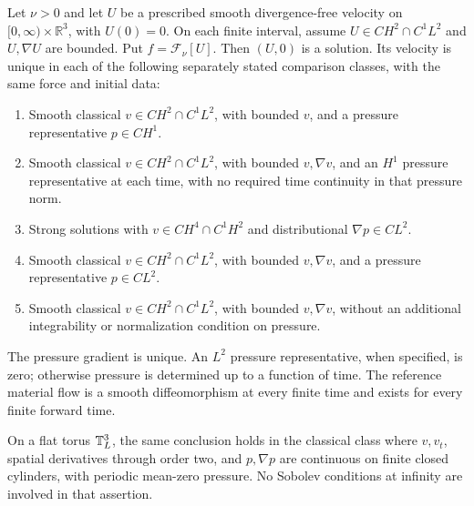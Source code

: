\begin{lemma}
\label{lem:b-comparison}\label{lem:p2-realization}
Let $\nu>0$ and let $U$ be a prescribed smooth divergence-free velocity
on $[0,\infty)\times\mathbb R^3$, with $U(0)=0$. On each finite interval,
assume $U\in CH^2\cap C^1L^2$ and $U,\nabla U$ are bounded. Put
$f=\mathcal F_\nu[U]$. Then $(U,0)$ is a solution. Its velocity is unique
in each of the following separately stated comparison classes, with the
same force and initial data:
\begin{enumerate}[label=(\roman*),itemsep=2pt]
\item Smooth classical $v\in CH^2\cap C^1L^2$, with bounded $v$, and a
pressure representative $p\in CH^1$.
\item Smooth classical $v\in CH^2\cap C^1L^2$, with bounded $v,\nabla v$,
and an $H^1$ pressure representative at each time, with no required time
continuity in that pressure norm.
\item Strong solutions with $v\in CH^4\cap C^1H^2$ and distributional
$\nabla p\in CL^2$.
\item Smooth classical $v\in CH^2\cap C^1L^2$, with bounded $v,\nabla v$,
and a pressure representative $p\in CL^2$.
\item Smooth classical $v\in CH^2\cap C^1L^2$, with bounded $v,\nabla v$,
without an additional integrability or normalization condition on pressure.
\end{enumerate}
The pressure gradient is unique. An $L^2$ pressure representative, when
specified, is zero; otherwise pressure is determined up to a function of
time. The reference material flow is a smooth diffeomorphism at every
finite time and exists for every finite forward time.

On a flat torus $\mathbb T_L^3$, the same conclusion holds in the classical class
where $v,v_t$, spatial derivatives through order two, and $p,\nabla p$ are
continuous on finite closed cylinders, with periodic mean-zero pressure.
No Sobolev conditions at infinity are involved in that assertion.
\end{lemma}
